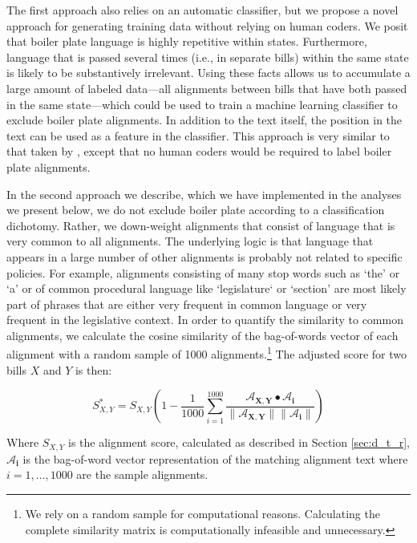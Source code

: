 \documentclass[12pt]{article} %
\begin{document}
The first approach also relies on an automatic classifier, but we propose a novel approach for
generating training data without relying on human coders. We posit that boiler plate language is highly repetitive within states. Furthermore, language
that is passed several times (i.e., in separate bills) within the same state is likely to be
substantively irrelevant. Using these facts allows us to accumulate a large
amount of labeled data---all alignments between bills that have both passed in
the same state---which could be used to train a machine learning classifier to exclude boiler plate alignments. In addition to the text
itself, the position in the text can be used as a feature in the classifier.
This approach is very similar to that taken by \citet{wilkerson2015tracing},
except that no human coders would be required to label boiler plate alignments.

In the second approach we describe, which we have implemented in the analyses we present below, we do not exclude boiler plate according to a classification dichotomy.
Rather, we down-weight alignments that consist of language that is
very common to all alignments. The underlying logic is that language that
appears in a large number of other alignments is probably not related to
specific policies. For example, alignments consisting of many stop words such as
`the' or `a' or of common procedural language like `legislature` or `section'
are most likely part of phrases that are either very frequent in common language
or very frequent in the legislative context. 
In order to quantify the similarity to common alignments, we calculate the
cosine similarity of the bag-of-words vector of each alignment with a random
sample of 1000 alignments.\footnote{We rely on a random sample for computational
reasons. Calculating the complete similarity matrix is computationally
infeasible and unnecessary.} The adjusted score for two bills $X$ and $Y$ is
then:

\begin{equation}
    S^*_{X,Y} = S_{X,Y} \left(1 -
    \frac{1}{1000}\sum_{i=1}^{1000}\frac{\mathbf{\mathcal{A}_{X,Y}} \bullet
    {\mathbf{\mathcal{A}_i}}}{\lVert\mathbf{\mathcal{A}_{X,Y}\rVert\lVert\mathbf{\mathcal{A}_i}}\rVert}\right)
\end{equation}

Where $S_{X,Y}$ is the alignment score, calculated as described in Section \ref{sec:d_t_r},
$\mathbf{\mathcal{A}_i}$ is the bag-of-word vector representation of the
matching alignment text where $i = 1,\dots,1000$ are the sample alignments.
\end{document}
